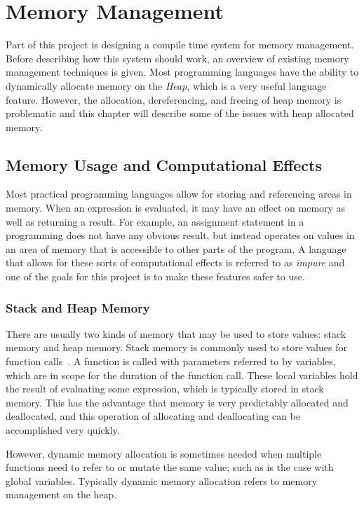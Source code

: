 \chapter{Memory Management}\label{sec:motivation} 
Part of this project is designing a compile time system for memory management.
Before describing how this system should work, an overview of existing memory
management techniques is given. Most programming languages have the ability to
dynamically allocate memory on the \textit{Heap}, which is a very useful
language feature.  However, the allocation, dereferencing, and freeing of heap
memory is problematic and this chapter will describe some of the issues with
heap allocated memory.

\section{Memory Usage and Computational Effects}
Most practical programming languages allow for storing and referencing areas
in memory. When an expression is evaluated, it may have an effect on memory as
well as returning a result. For example, an assignment statement in a programming
does not have any obvious result, but instead operates on values in an area of
memory that is accessible to other parts of the program. A language that allows
for these sorts of computational effects is referred to as \textit{impure} and
one of the goals for this project is to make these features safer to use.

\subsection{Stack and Heap Memory}
There are usually two kinds of memory that may be used to store values: stack
memory and heap memory. Stack memory is commonly used to store values for
function calls~\cite{appel}. A function is called with parameters referred to by variables,
which are in scope for the duration of the function call. These local variables
hold the result of evaluating some expression, which is typically stored in
stack memory. This has the advantage that memory is very predictably allocated
and deallocated, and this operation of allocating and deallocating can be
accomplished very quickly. 

However, dynamic memory allocation is sometimes needed when multiple functions
need to refer to or mutate the same value; such as is the case with global
variables. Typically dynamic memory allocation refers to memory management on 
the heap.

